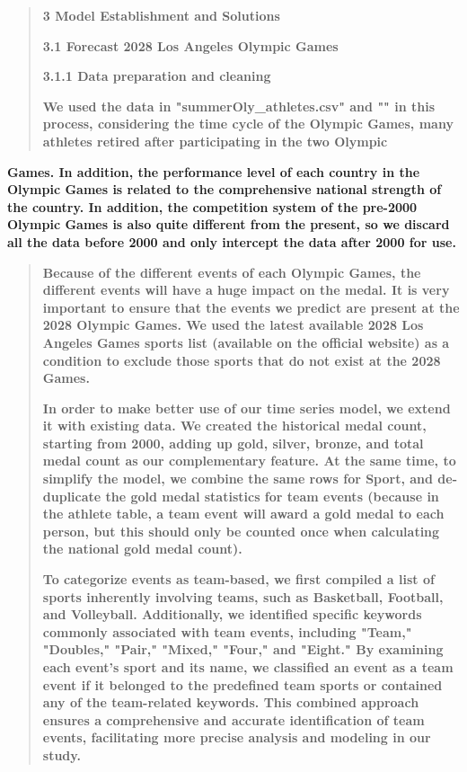 \documentclass[12pt,a4paper]{article}
\renewenvironment{quote}{\begin{quotation}}{\end{quotation}}  %
\begin{document}
    \begin{quote}
    \protect{}\label{bookmark27}{}\textbf{3 Model Establishment
    and Solutions}
    
    \protect{}\label{bookmark8-1}{}\textbf{3.1 Forecast 2028
    Los Angeles Olympic Games}
    
    \protect{}\label{bookmark9-1}{}\textbf{3.1.1 Data
    preparation and cleaning}
    
    \textbf{We used the data in "summerOly\_athletes.csv" and "" in this
    process, considering the time cycle of the Olympic Games, many athletes
    retired after participating in the two Olympic}
    \end{quote}
    
    \textbf{Games. In addition, the performance level of each country in the
    Olympic Games is related to the comprehensive national strength of the
    country. In addition, the competition system of the pre-2000 Olympic
    Games is also quite different from the present, so we discard all the
    data before 2000 and only intercept the data after 2000 for use.}
    
    \begin{quote}
    \textbf{Because of the different events of each Olympic Games, the
    different events will have a huge impact on the medal. It is very
    important to ensure that the events we predict are present at the 2028
    Olympic Games. We used the latest available 2028 Los Angeles Games
    sports list (available on the official website) as a condition to
    exclude those sports that do not exist at the 2028 Games.}
    
    \textbf{In order to make better use of our time series model, we extend
    it with existing data. We created the historical medal count, starting
    from 2000, adding up gold, silver, bronze, and total medal count as our
    complementary feature. At the same time, to simplify the model, we
    combine the same rows for Sport, and de-duplicate the gold medal
    statistics for team events (because in the athlete table, a team event
    will award a gold medal to each person, but this should only be counted
    once when calculating the national gold medal count).}
    
    \textbf{To categorize events as team-based, we first compiled a list of
    sports inherently involving teams, such as Basketball, Football, and
    Volleyball. Additionally, we identified specific keywords commonly
    associated with team events, including "Team," "Doubles," "Pair,"
    "Mixed," "Four," and "Eight." By examining each event's sport and its
    name, we classified an event as a team event if it belonged to the
    predefined team sports or contained any of the team-related keywords.
    This combined approach ensures a comprehensive and accurate
    identification of team events, facilitating more precise analysis and
    modeling in our study.}
    \end{quote}
    
\end{document}
